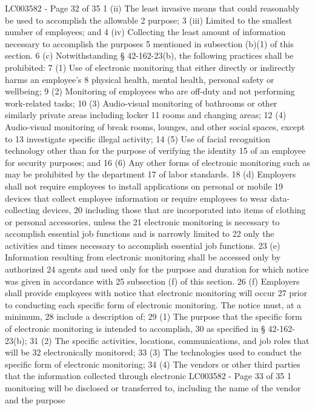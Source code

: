 LC003582 - Page 32 of 35
1 (ii) The least invasive means that could reasonably be used to accomplish the allowable
2 purpose;
3 (iii) Limited to the smallest number of employees; and
4 (iv) Collecting the least amount of information necessary to accomplish the purposes
5 mentioned in subsection (b)(1) of this section.
6 (c) Notwithstanding § 42-162-23(b), the following practices shall be prohibited:
7 (1) Use of electronic monitoring that either directly or indirectly harms an employee's
8 physical health, mental health, personal safety or wellbeing;
9 (2) Monitoring of employees who are off-duty and not performing work-related tasks;
10 (3) Audio-visual monitoring of bathrooms or other similarly private areas including locker
11 rooms and changing areas;
12 (4) Audio-visual monitoring of break rooms, lounges, and other social spaces, except to
13 investigate specific illegal activity;
14 (5) Use of facial recognition technology other than for the purpose of verifying the identity
15 of an employee for security purposes; and
16 (6) Any other forms of electronic monitoring such as may be prohibited by the department
17 of labor standards.
18 (d) Employers shall not require employees to install applications on personal or mobile
19 devices that collect employee information or require employees to wear data-collecting devices,
20 including those that are incorporated into items of clothing or personal accessories, unless the
21 electronic monitoring is necessary to accomplish essential job functions and is narrowly limited to
22 only the activities and times necessary to accomplish essential job functions.
23 (e) Information resulting from electronic monitoring shall be accessed only by authorized
24 agents and used only for the purpose and duration for which notice was given in accordance with
25 subsection (f) of this section.
26 (f) Employers shall provide employees with notice that electronic monitoring will occur
27 prior to conducting each specific form of electronic monitoring. The notice must, at a minimum,
28 include a description of;
29 (1) The purpose that the specific form of electronic monitoring is intended to accomplish,
30 as specified in § 42-162-23(b);
31 (2) The specific activities, locations, communications, and job roles that will be
32 electronically monitored;
33 (3) The technologies used to conduct the specific form of electronic monitoring;
34 (4) The vendors or other third parties that the information collected through electronic 
LC003582 - Page 33 of 35
1 monitoring will be disclosed or transferred to, including the name of the vendor and the purpose
